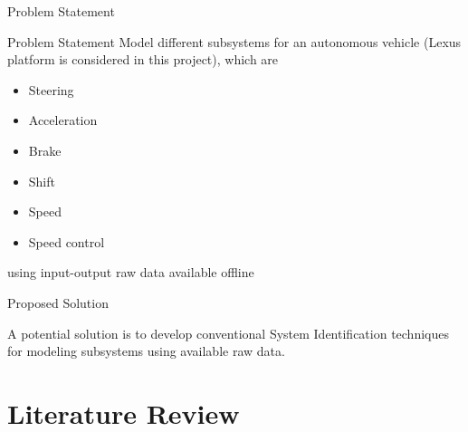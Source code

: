 \documentclass{beamer}
\begin{document}
\begin{frame}{Problem Statement}
  \begin{block}{Problem Statement}
      Model different subsystems for an autonomous vehicle (Lexus platform is considered in this project), which are
      \begin{itemize}
          \item Steering
          \item Acceleration
          \item Brake
          \item Shift
          \item Speed
          \item Speed control
        \end{itemize} 
        using input-output raw data available offline
  \end{block}
  \pause
  \begin{block}{Proposed Solution}
    \begin{large}
      A potential solution is to develop conventional System Identification techniques for modeling subsystems using available raw data.  
    \end{large}
  \end{block}
\end{frame}


\section{Literature Review}
\end{document}
